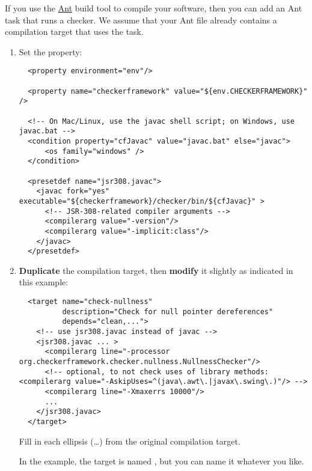 If you use the \href{http://ant.apache.org/}{Ant} build tool to compile
your software, then you can add an Ant task that runs a checker.  We assume
that your Ant file already contains a compilation target that uses the
 task.

\begin{enumerate}
\item
Set the  property:

\begin{smaller}
\begin{Verbatim}
  <property environment="env"/>

  <property name="checkerframework" value="${env.CHECKERFRAMEWORK}" />

  <!-- On Mac/Linux, use the javac shell script; on Windows, use javac.bat -->
  <condition property="cfJavac" value="javac.bat" else="javac">
      <os family="windows" />
  </condition>

  <presetdef name="jsr308.javac">
    <javac fork="yes" executable="${checkerframework}/checker/bin/${cfJavac}" >
      <!-- JSR-308-related compiler arguments -->
      <compilerarg value="-version"/>
      <compilerarg value="-implicit:class"/>
    </javac>
  </presetdef>
\end{Verbatim}
\end{smaller}

\item \textbf{Duplicate} the compilation target, then \textbf{modify} it slightly as
indicated in this example:

\begin{smaller}
\begin{Verbatim}
  <target name="check-nullness"
          description="Check for null pointer dereferences"
          depends="clean,...">
    <!-- use jsr308.javac instead of javac -->
    <jsr308.javac ... >
      <compilerarg line="-processor org.checkerframework.checker.nullness.NullnessChecker"/>
      <!-- optional, to not check uses of library methods: <compilerarg value="-AskipUses=^(java\.awt\.|javax\.swing\.)"/> -->
      <compilerarg line="-Xmaxerrs 10000"/>
      ...
    </jsr308.javac>
  </target>
\end{Verbatim}
\end{smaller}

Fill in each ellipsis (\ldots) from the original compilation target.

In the example, the target is named , but you can
name it whatever you like.
\end{enumerate}

